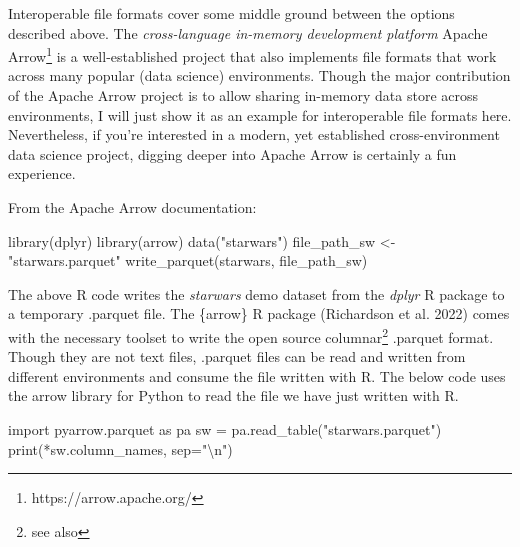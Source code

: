 \documentclass[
  12pt,
  letterpaper,
]{krantz}
\newenvironment{Shaded}{\begin{snugshade}}{\end{snugshade}}
\newcommand{\BuiltInTok}[1]{\textcolor[rgb]{0.00,0.23,0.31}{#1}}
\newcommand{\CharTok}[1]{\textcolor[rgb]{0.13,0.47,0.30}{#1}}
\newcommand{\FunctionTok}[1]{\textcolor[rgb]{0.28,0.35,0.67}{#1}}
\newcommand{\ImportTok}[1]{\textcolor[rgb]{0.00,0.46,0.62}{#1}}
\newcommand{\NormalTok}[1]{\textcolor[rgb]{0.00,0.23,0.31}{#1}}
\newcommand{\OperatorTok}[1]{\textcolor[rgb]{0.37,0.37,0.37}{#1}}
\newcommand{\OtherTok}[1]{\textcolor[rgb]{0.00,0.23,0.31}{#1}}
\newcommand{\StringTok}[1]{\textcolor[rgb]{0.13,0.47,0.30}{#1}}
\begin{document}
Interoperable file formats cover some
middle ground between the options described above. The
\emph{cross-language in-memory development platform} Apache
Arrow\footnote{https://arrow.apache.org/} is a well-established project
that also implements file formats that work across many popular (data
science) environments. Though the major contribution of the Apache Arrow
project is to allow sharing in-memory data store across environments, I
will just show it as an example for interoperable file formats here.
Nevertheless, if you're interested in a modern, yet established
cross-environment data science project, digging deeper into Apache
Arrow is certainly a fun experience.

From the Apache Arrow documentation:

\normalsize

\begin{Shaded}
\begin{Highlighting}[]
\FunctionTok{library}\NormalTok{(dplyr)}
\FunctionTok{library}\NormalTok{(arrow)}
\FunctionTok{data}\NormalTok{(}\StringTok{"starwars"}\NormalTok{)}
\NormalTok{file\_path\_sw }\OtherTok{\textless{}{-}} \StringTok{"starwars.parquet"}
\FunctionTok{write\_parquet}\NormalTok{(starwars, file\_path\_sw)}
\end{Highlighting}
\end{Shaded}

\normalsize

The above R code writes the \emph{starwars} demo dataset from the
\emph{dplyr} R package to a temporary .parquet file. The \{arrow\} R
package (Richardson et al. 2022) comes with the necessary toolset to
write the open source columnar\footnote{see also} .parquet
format. Though they are not text files, .parquet files
can be read and written from different environments and consume the file
written with R. The below code uses the arrow library for Python to read
the file we have just written with R.

\normalsize

\begin{Shaded}
\begin{Highlighting}[]
\ImportTok{import}\NormalTok{ pyarrow.parquet }\ImportTok{as}\NormalTok{ pa}
\NormalTok{sw }\OperatorTok{=}\NormalTok{ pa.read\_table(}\StringTok{"starwars.parquet"}\NormalTok{)}
\BuiltInTok{print}\NormalTok{(}\OperatorTok{*}\NormalTok{sw.column\_names, sep}\OperatorTok{=}\StringTok{"}\CharTok{\textbackslash{}n}\StringTok{"}\NormalTok{)}
\end{Highlighting}
\end{Shaded}
\end{document}
